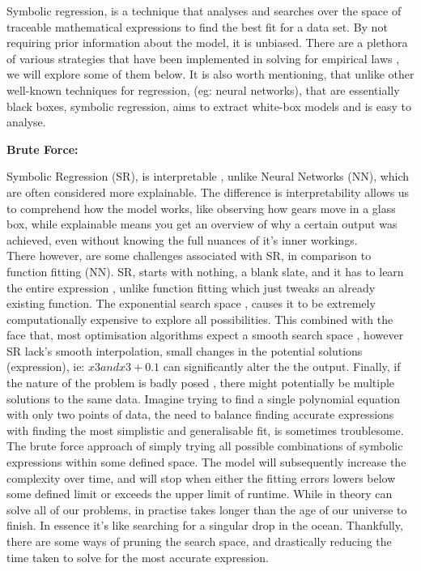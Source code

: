 \documentclass{article}
\begin{document}
Symbolic regression, is a technique that analyses and searches over the space of traceable mathematical
expressions to find the best fit for a data set. By not requiring prior information about the model,
it is unbiased. There are a plethora of various strategies that have been implemented in solving for
empirical laws \cite{Schmidt22009}, we will explore some of them below. It is also worth mentioning, that unlike other
well-known techniques for regression, (eg: neural networks), that are essentially black boxes, symbolic
regression, aims to extract white-box models and is easy to analyse.\\

\begin{center} 
  \textbf {\Large  Brute Force:}
\end{center}
Symbolic Regression (SR), is interpretable \cite{Aldeia2022}, unlike Neural Networks (NN), which are often considered more explainable. The difference is interpretability allows us to comprehend how the model works,
like observing how gears move in a glass box, while explainable means you get an overview of why a
certain output was achieved, even without knowing the full nuances of it’s inner workings.\\

There however, are some challenges associated with SR, in comparison to function fitting (NN). SR,
starts with nothing, a blank slate, and it has to learn the entire expression \cite{Cranmer2020}, unlike function fitting
which just tweaks an already existing function. The exponential search space \cite{Worm2014} , causes it to be
extremely computationally expensive to explore all possibilities. This combined with the face that,
most optimisation algorithms expect a smooth search space \cite{Makke2024}, however SR lack’s smooth interpolation, small changes in the potential solutions (expression), ie: $ x3 and x3 + 0.1$ can significantly alter
the the output. Finally, if the nature of the problem is badly posed \cite{Rivero2022}, there might potentially be
multiple solutions to the same data. Imagine trying to find a single polynomial equation with only two
points of data, the need to balance finding accurate expressions with finding the most simplistic and
generalisable fit, is sometimes troublesome.\\

The brute force approach of simply trying all possible combinations of symbolic expressions within some defined space. The model will subsequently increase the complexity over time, and will stop when either the fitting errors lowers below some defined limit or exceeds the upper limit of runtime. While in theory can solve all of our problems, in practise takes longer than the age of our universe to finish. In essence it's like searching for a singular drop in the ocean. Thankfully, there are some ways of pruning the search space, and drastically reducing the time taken to solve for the most accurate expression. \\ 
\end{document}
